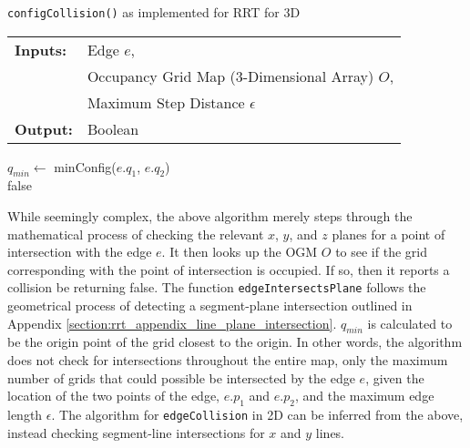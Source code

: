 \begin{algorithm}[ht!]
    \caption{\texttt{configCollision()} as implemented for \gls{RRT} for 3D}
    \SetAlgoLined
    \begin{tabular}{l l}
    \textbf{Inputs:}    & Edge $e$,\\ 
                        & Occupancy Grid Map (3-Dimensional Array) $O$,\\ 
                        & Maximum Step Distance $\epsilon$ \\
    \textbf{Output:}    & Boolean \\
    \end{tabular}
    
        $q_{min} \leftarrow $ minConfig($e.q_1$, $e.q_2$) \\
        \Return false
\end{algorithm}

While seemingly complex, the above algorithm merely steps through the mathematical process of checking the relevant $x$, $y$, and $z$ planes for a point of intersection with the edge $e$. It then looks up the \gls{OGM} $O$ to see if the grid corresponding with the point of intersection is occupied. If so, then it reports a collision be returning false. The function \texttt{edgeIntersectsPlane} follows the geometrical process of detecting a segment-plane intersection outlined in Appendix \ref{section:rrt_appendix_line_plane_intersection}. $q_{min}$ is calculated to be the origin point of the grid closest to the origin. In other words, the algorithm does not check for intersections throughout the entire map, only the maximum number of grids that could possible be intersected by the edge $e$, given the location of the two points of the edge, $e.p_1$ and $e.p_2$, and the maximum edge length $\epsilon$. The algorithm for \texttt{edgeCollision} in \gls{2D} can be inferred from the above, instead checking segment-line intersections for $x$ and $y$ lines.